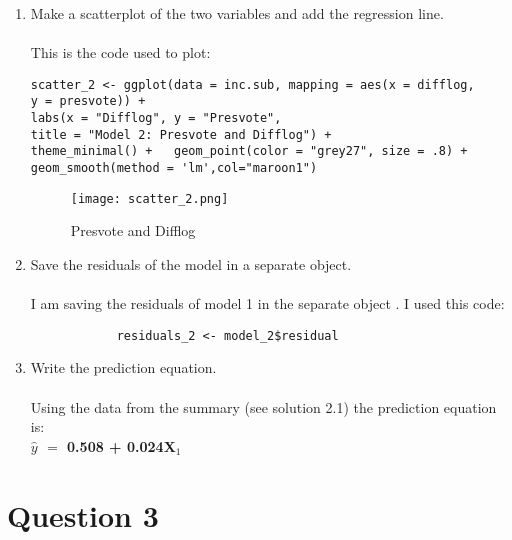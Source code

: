 \documentclass[12pt,letterpaper]{article}
\begin{document}
\begin{enumerate}
		
		\vspace{5cm}
		\item Make a scatterplot of the two variables and add the regression line. 
			\\\\ This is the code used to plot:
		\begin{verbatim}
scatter_2 <- ggplot(data = inc.sub, mapping = aes(x = difflog,
y = presvote)) +   
labs(x = "Difflog", y = "Presvote",       
title = "Model 2: Presvote and Difflog") +  
theme_minimal() +   geom_point(color = "grey27", size = .8) +  
geom_smooth(method = 'lm',col="maroon1")
		\end{verbatim}
		
		\begin{figure}[h!]
			\caption{\footnotesize{Presvote and Difflog}}
			\vspace{.2cm}
			\centering
			\label{fig:}
			\texttt{[image: scatter\_2.png]}
		\end{figure}		
\newpage		
		
			\vspace{5cm}
		\item Save the residuals of the model in a separate object.	
			\\\\
		I am saving the residuals of model 1 in the separate object . I used this code:
		\begin{verbatim}
			residuals_2 <- model_2$residual
		\end{verbatim}
		
			\vspace{1cm}

	\item Write the prediction equation. \\\\
	Using the data from the summary (see solution 2.1) the prediction equation is:\\ 
	\textbf{$\hat{y}$ $=$ 0.508 + 0.024X$_1$ }
	\end{enumerate}
	
	\newpage	
\section*{Question 3}
\end{document}
